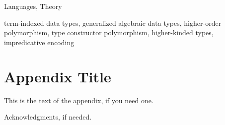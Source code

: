 \documentclass[preprint]{sigplanconf}
\theoremstyle{plain}
\theoremstyle{remark}
\theoremstyle{definition}
\begin{document}
\terms
Languages, Theory

\keywords
term-indexed data types, generalized algebraic data types,
higher-order polymorphism, type constructor polymorphism, higher-kinded types,
impredicative encoding











\appendix
\section{Appendix Title}

This is the text of the appendix, if you need one.

\acks

Acknowledgments, if needed.






\end{document}

